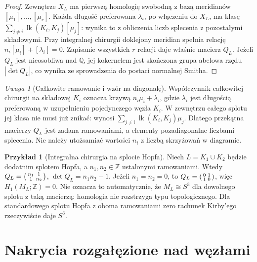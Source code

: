 \documentclass[11pt,a4paper]{report}
\numberwithin{equation}{section}
\theoremstyle{plain}
\theoremstyle{definition}
\newtheorem{przyklad}[twierdzenie]{Przykład}
\theoremstyle{remark}
\newtheorem{uwaga}[twierdzenie]{Uwaga}
\begin{document}
\begin{proof}
Zewnętrze $X_L$ ma pierwszą homologię swobodną z bazą
meridianów $[\mu_1],\ldots,[\mu_r]$. Każda długość
preferowana $\lambda_i$, po włączeniu do $X_L$,
ma klasę $\sum_{j\ne i}\operatorname{lk}(K_i,K_j)[\mu_j]$:
wynika to z obliczenia liczb splecenia z pozostałymi
składowymi. Przy integralnej chirurgii doklejony meridian
spełnia relację $n_i[\mu_i]+[\lambda_i]=0$.
Zapisanie wszystkich $r$ relacji daje właśnie macierz $Q_L$.
Jeżeli $Q_L$ jest nieosobliwa nad $\mathbb Q$, jej
kokernelem jest skończona grupa abelowa rzędu
$|\det Q_L|$, co wynika ze sprowadzenia do postaci
normalnej Smitha.
\end{proof}

\begin{uwaga}[Całkowite ramowanie i wzór na diagonalę]
Współczynnik całkowitej chirurgii na składowej $K_i$
oznacza krzywą $n_i\mu_i+\lambda_i$, gdzie $\lambda_i$
jest długością preferowaną w uzupełnieniu pojedynczego węzła
$K_i$. W zewnętrzu całego splotu jej klasa nie musi już
znikać: wynosi $\sum_{j\ne i}\operatorname{lk}(K_i,K_j)\mu_j$.
Dlatego przekątna macierzy $Q_L$ jest zadana ramowaniami,
a elementy pozadiagonalne liczbami splecenia. Nie należy
utożsamiać wartości $n_i$ z liczbą skrzyżowań w diagramie.
\end{uwaga}

\begin{przyklad}[Integralna chirurgia na splocie Hopfa]
Niech $L=K_1\cup K_2$ będzie dodatnim splotem Hopfa,
a $n_1,n_2\in\mathbb Z$ ustalonymi ramowaniami.
Wtedy $Q_L=\begin{psmallmatrix}n_1&1\\1&n_2\end{psmallmatrix}$,
$\det Q_L=n_1n_2-1$. Jeżeli $n_1=n_2=0$, to
$Q_L=\begin{psmallmatrix}0&1\\1&0\end{psmallmatrix}$,
więc $H_1(M_L;\mathbb Z)=0$. Nie oznacza to automatycznie,
że $M_L\cong S^3$ dla dowolnego splotu z taką macierzą:
homologia nie rozstrzyga typu topologicznego. Dla standardowego
splotu Hopfa z oboma ramowaniami zero rachunek Kirby'ego
rzeczywiście daje $S^3$.
\end{przyklad}

\section{Nakrycia rozgałęzione nad węzłami}
\label{sec:kt-branched}
\end{document}
